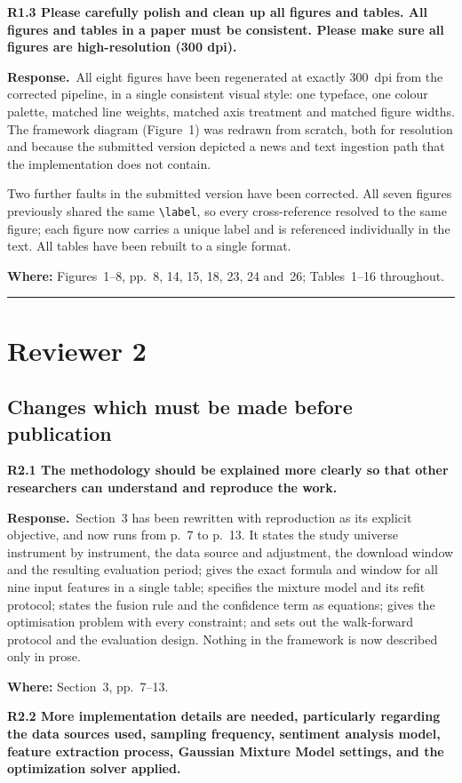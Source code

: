 \documentclass[11pt,a4paper]{article}
\newcommand{\rc}[1]{\par\medskip\noindent\textbf{#1}\par\nopagebreak}
\newcommand{\resp}{\par\noindent\textbf{Response.}\ }
\newcommand{\where}[1]{\par\smallskip\noindent\textcolor{blue!55!black}{\textbf{Where:} #1}\par}
\begin{document}
\rc{R1.3 Please carefully polish and clean up all figures and tables. All figures and
tables in a paper must be consistent. Please make sure all figures are high-resolution
(300 dpi).}

\resp All eight figures have been regenerated at exactly 300~dpi from the corrected
pipeline, in a single consistent visual style: one typeface, one colour palette, matched
line weights, matched axis treatment and matched figure widths. The framework diagram
(Figure~1) was redrawn from scratch, both for resolution and because the submitted
version depicted a news and text ingestion path that the implementation does not
contain.

Two further faults in the submitted version have been corrected. All seven figures
previously shared the same \verb|\label|, so every cross-reference resolved to the same
figure; each figure now carries a unique label and is referenced individually in the
text. All tables have been rebuilt to a single format.
\where{Figures~1--8, pp.~8, 14, 15, 18, 23, 24 and~26; Tables~1--16 throughout.}

\bigskip
\hrule
\section*{Reviewer 2}

\subsection*{Changes which must be made before publication}

\rc{R2.1 The methodology should be explained more clearly so that other researchers can
understand and reproduce the work.}

\resp Section~3 has been rewritten with reproduction as its explicit objective, and now
runs from p.~7 to p.~13. It states the study universe instrument by instrument, the data
source and adjustment, the download window and the resulting evaluation period; gives
the exact formula and window for all nine input features in a single table; specifies
the mixture model and its refit protocol; states the fusion rule and the confidence term
as equations; gives the optimisation problem with every constraint; and sets out the
walk-forward protocol and the evaluation design. Nothing in the framework is now
described only in prose.
\where{Section~3, pp.~7--13.}

\rc{R2.2 More implementation details are needed, particularly regarding the data sources
used, sampling frequency, sentiment analysis model, feature extraction process, Gaussian
Mixture Model settings, and the optimization solver applied.}
\end{document}
